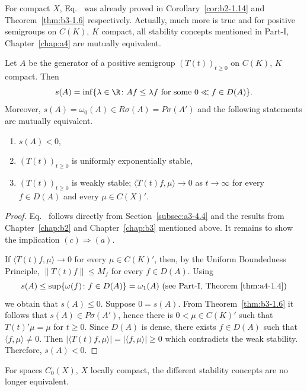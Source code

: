 For compact $X$, Eq.~ was already proved in Corollary~\ref{cor:b2-1.14} and Theorem~\ref{thm:b3-1.6} respectively. 
Actually, much more is true and for positive semigroups on $C(K)$, $K$ compact, all stability concepts mentioned in Part-I, Chapter~\ref{chap:a4} are mutually equivalent.
\begin{theorem}\label{thm:b4-1.1}%
Let $A$ be the generator of a positive semigroup $(T(t))_{t \geq 0}$ on $C(K)$, $K$ compact. Then
\begin{equation}\label{eq:b4-1.2}
   s(A) = \inf \{\lambda \in \R \colon Af \leq \lambda f \text{ for some } 0 \ll f \in D(A)\} .
\end{equation}
Moreover, $s(A) = \omega_{0}(A) \in R\sigma(A) = P\sigma(A')$ and the following statements are mutually equivalent.
\begin{enumerate}[\upshape (a)]
\item $s(A) < 0$,
\item $(T(t))_{t \geq 0}$ is uniformly exponentially stable,
\item $(T(t))_{t \geq 0}$ is weakly stable; \ie $\langle T(t)f,\mu \rangle \to 0$ as $t \to \infty$ for every $f \in D(A)$ and every $\mu \in C(X)'$.
\end{enumerate}
\end{theorem}
\begin{proof}
Eq.~ follows directly from Section~\ref{subsec:a3-4.4} and the results from Chapter~\ref{chap:b2} and Chapter~\ref{chap:b3} mentioned above. 
It remains to show the implication $(c) \Rightarrow (a)$.

If\/ $\langle T(t)f,\mu \rangle \to 0$ for every $\mu \in C(K)'$, then, by the Uniform Boundedness Principle, $\|T(t)f\| \leq M_f$ for every $f \in D(A)$. 
Using 
\[
s(A) \leq \sup \{\omega(f)\colon f \in D(A)\} = \omega_1(A)
\text{ (see Part-I, Theorem~\ref{thm:a4-1.4})}
\]
we obtain that $s(A) \leq 0$. 
Suppose $0 = s(A)$. 
From Theorem~\ref{thm:b3-1.6} it follows that $s(A) \in P\sigma(A')$, hence there is $0 < \mu \in C(K)'$ such that $T(t)'\mu = \mu$ for $t \geq 0$. 
Since $D(A)$ is dense, there exists $f \in D(A)$ such that $\langle f,\mu \rangle \neq 0$. 
Then $|\langle T(t)f,\mu \rangle| = |\langle f,\mu \rangle|  \ge  0$ which contradicts the weak stability. Therefore, $s(A) < 0$.
\end{proof}
For spaces $C_{0}(X)$, $X$ locally compact, the different stability concepts are no longer equivalent.
